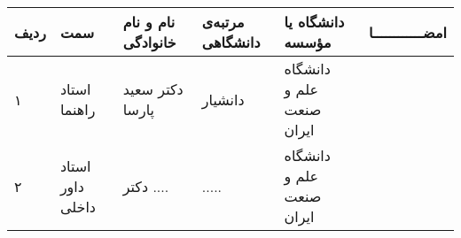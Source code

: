 \begin{center}
    \begin{tabular}{| p{8mm} | p{18mm} | p{} |p{14mm}|p{}|c|}
        \hline
        ردیف                               & سمت                       & نام و نام خانوادگی                & مرتبه‌ی \newline دانشگاهی & دانشگاه یا مؤسسه & امضــــــــــــا \\
        \hline
        ۱                                  & استاد راهنما              & دکتر \newline سعید پارسا
                                           & دانشیار                   & دانشگاه \newline علم و صنعت ایران &                                                                \\
        \hline
        ۲                                  & استاد داور \newline داخلی & دکتر \newline ....                & .....                    &
        دانشگاه  \newline علم ‌و صنعت ایران &                                                                                                                                \\
        \hline
    \end{tabular}
\end{center}

\esalatPage
\mojavezPage

\newpage

